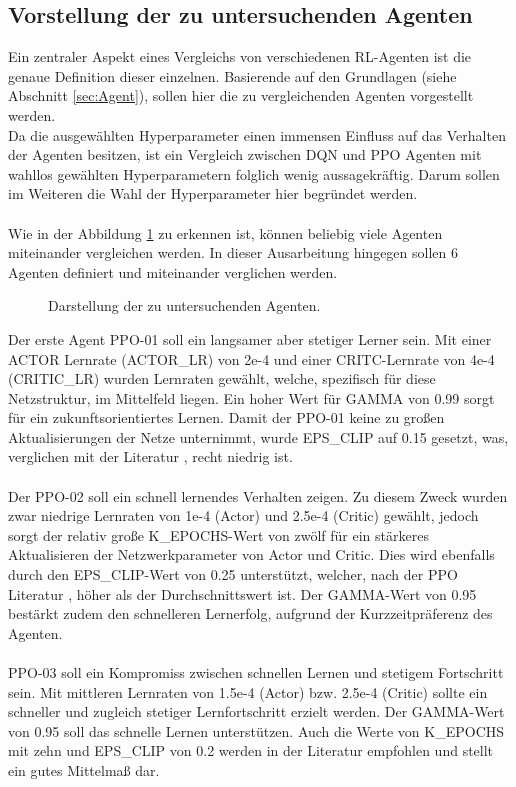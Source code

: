 \subsection{Vorstellung der zu untersuchenden Agenten} \label{sec:Konzept_Vorstellung_Agenten}
Ein zentraler Aspekt eines Vergleichs von verschiedenen RL-Agenten ist die genaue Definition dieser einzelnen. 
Basierende auf den Grundlagen (siehe Abschnitt \ref{sec:Agent}), sollen hier die zu vergleichenden Agenten vorgestellt werden.\\
Da die ausgewählten Hyperparameter einen immensen Einfluss auf das Verhalten der Agenten besitzen, ist ein Vergleich zwischen DQN und PPO Agenten mit wahllos gewählten Hyperparametern folglich wenig aussagekräftig. Darum sollen im Weiteren die Wahl der Hyperparameter hier begründet werden.\\
\\Wie in der Abbildung \ref{fig:Agenten} zu erkennen ist, können beliebig viele Agenten miteinander vergleichen werden. In dieser Ausarbeitung hingegen sollen 6 Agenten definiert und miteinander verglichen werden.
\begin{figure}[H]
	\centering
	\def\svgscale{0.102}
	
	\caption[Agenten]{Darstellung der zu untersuchenden Agenten.}
	\label{fig:Agenten}
\end{figure}
Der erste Agent PPO-01 soll ein langsamer aber stetiger Lerner sein. Mit einer ACTOR Lernrate (ACTOR\_LR) von 2e-4 und einer CRITC-Lernrate von 4e-4 (CRITIC\_LR) wurden Lernraten gewählt, welche, spezifisch für diese Netzstruktur, im Mittelfeld liegen. Ein hoher Wert für GAMMA von 0.99 sorgt für ein zukunftsorientiertes Lernen. Damit der PPO-01 keine zu großen Aktualisierungen der Netze unternimmt, wurde EPS\_CLIP auf 0.15 gesetzt, was, verglichen mit der Literatur \cite[S. 6]{PPO}, recht niedrig ist.\\
\\Der PPO-02 soll ein schnell lernendes Verhalten zeigen. Zu diesem Zweck wurden zwar niedrige Lernraten von 1e-4 (Actor) und 2.5e-4 (Critic) gewählt, jedoch sorgt der relativ große K\_EPOCHS-Wert von zwölf für ein stärkeres Aktualisieren der Netzwerkparameter von Actor und Critic. Dies wird ebenfalls durch den EPS\_CLIP-Wert von 0.25 unterstützt, welcher, nach der PPO Literatur \cite[S. 6]{PPO}, höher als der Durchschnittswert ist. Der GAMMA-Wert von 0.95 bestärkt zudem den schnelleren Lernerfolg, aufgrund der Kurzzeitpräferenz des Agenten.\\
\\PPO-03 soll ein Kompromiss zwischen schnellen Lernen und stetigem Fortschritt sein. Mit mittleren Lernraten von 1.5e-4 (Actor) bzw. 2.5e-4 (Critic) sollte ein schneller und zugleich stetiger Lernfortschritt erzielt werden. Der GAMMA-Wert von 0.95 soll das schnelle Lernen unterstützen. Auch die Werte von K\_EPOCHS mit zehn und EPS\_CLIP von 0.2 werden in der Literatur \cite[Anhang A]{PPO} empfohlen und stellt ein gutes Mittelmaß dar.\\
